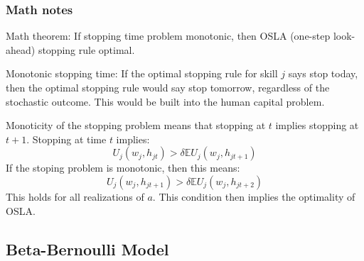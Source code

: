 \documentclass[10 pt]{article}
\begin{document}
\subsubsection*{Math notes}
Math theorem: If stopping time problem monotonic, then OSLA (one-step look-ahead) stopping rule optimal. 
\begin{blist}

\item Monotonic stopping time: If the optimal stopping rule for skill $j$ says stop today, then the optimal stopping rule would say stop tomorrow, regardless of the stochastic outcome. This would be built into the human capital problem. 

\item Monoticity of the stopping problem means that stopping at $t$ implies stopping at $t+1$. Stopping at time $t$ implies: 
\begin{equation*}
 U_j(w_j, h_{jt}) > \delta \mathbb{E} U_j(w_j, h_{jt+1})
\end{equation*}
If the stoping problem is monotonic, then this means: 
\begin{equation*}
 U_j(w_j, h_{jt+1}) > \delta \mathbb{E} U_j(w_j, h_{jt+2})
\end{equation*}
This holds for all realizations of $a$. 
This condition then implies the optimality of OSLA.
\end{blist}


\subsection{Beta-Bernoulli Model}
\end{document}
